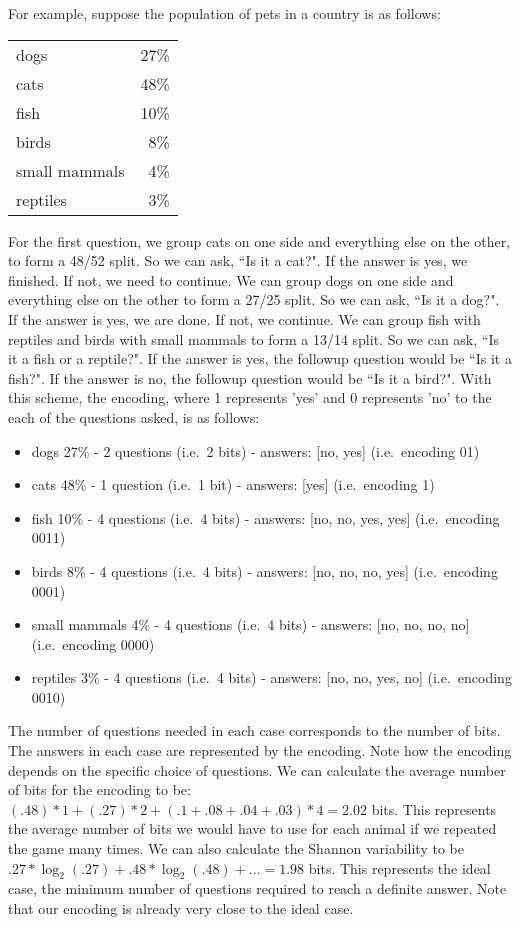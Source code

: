 \documentclass[iopart]{revtex4-1}
\begin{document}
For example, suppose the population of pets in a country is as follows:
\begin{table}[h]
\begin{tabular}{lr}
dogs & 27\% \\
cats & 48\% \\
fish & 10\% \\
birds & 8\% \\
small mammals & 4\% \\
reptiles & 3\%
\end{tabular}
\end{table}

\noindent
For the first question, we group cats on one side and everything else on the other, to form a 48/52 split. So we can ask, ``Is it a cat?". If the answer is yes, we finished. If not, we need to continue. We can group dogs on one side and everything else on the other to form a 27/25 split. So we can ask, ``Is it a dog?". If the answer is yes, we are done. If not, we continue. We can group fish with reptiles and birds with small mammals to form a 13/14 split. So we can ask, ``Is it a fish or a reptile?". If the answer is yes, the followup question would be ``Is it a fish?". If the answer is no, the followup question would be ``Is it a bird?". With this scheme, the encoding, where 1 represents 'yes' and 0 represents 'no' to the each of the questions asked, is as follows:
\begin{itemize}
\item dogs 27\% - 2 questions (i.e.~2 bits) - answers: [no, yes] (i.e.~encoding 01)
\item cats 48\% - 1 question (i.e.~1 bit) - answers: [yes] (i.e.~encoding 1)
\item fish 10\% - 4 questions (i.e.~4 bits) - answers: [no, no, yes, yes] (i.e.~encoding 0011)
\item birds 8\% - 4 questions (i.e.~4 bits) - answers: [no, no, no, yes] (i.e.~encoding 0001)
\item small mammals 4\% - 4 questions (i.e.~4 bits) - answers: [no, no, no, no] (i.e.~encoding 0000)
\item reptiles 3\% - 4 questions (i.e.~4 bits) - answers: [no, no, yes, no] (i.e.~encoding 0010)
\end{itemize}
The number of questions needed in each case corresponds to the number of bits. The answers in each case are represented by the encoding. Note how the encoding depends on the specific choice of questions. We can calculate the average number of bits for the encoding to be:  $(.48) * 1 + (.27) * 2 + (.1 + .08 + .04 + .03) * 4 = 2.02$ bits. This represents the average number of bits we would have to use for each animal if we repeated the game many times. We can also calculate the Shannon variability to be $.27 * \log_2(.27) + .48 * \log_2 (.48) + ... =1.98$ bits. This represents the ideal case, the minimum number of questions required to reach a definite answer. Note that our encoding is already very close to the ideal case.
\end{document}
